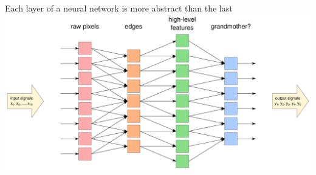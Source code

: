 \documentclass[aspectratio=169]{beamer}
\begin{document}
\begin{frame}{Each layer of a neural network is more abstract than the last}
\vspace{0.25 cm}
\includegraphics[width=\linewidth]{convolutional-neural-network-layers-labeled.pdf}
\end{frame}
\end{document}
